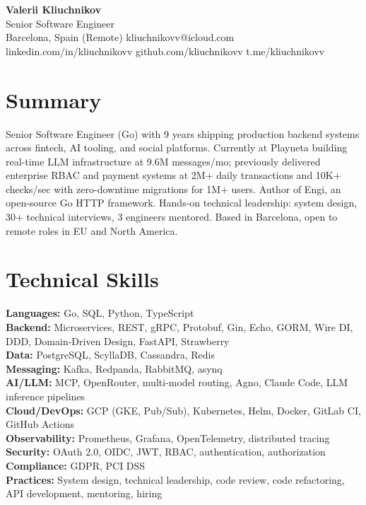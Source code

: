 \documentclass[11pt,a4paper]{article}
\begin{document}
\begin{center}
{\LARGE \textbf{Valerii Kliuchnikov}}\\[3pt]
Senior Software Engineer\\[3pt]
Barcelona, Spain (Remote) \textbar{} kliuchnikovv@icloud.com\\
linkedin.com/in/kliuchnikovv \textbar{} github.com/kliuchnikovv \textbar{} t.me/kliuchnikovv
\end{center}

\section{Summary}
Senior Software Engineer (Go) with 9 years shipping production backend systems across fintech, AI tooling, and social platforms. Currently at Playneta building real-time LLM infrastructure at 9.6M messages/mo; previously delivered enterprise RBAC and payment systems at 2M+ daily transactions and 10K+ checks/sec with zero-downtime migrations for 1M+ users. Author of Engi, an open-source Go HTTP framework. Hands-on technical leadership: system design, 30+ technical interviews, 3 engineers mentored. Based in Barcelona, open to remote roles in EU and North America.

\section{Technical Skills}
\textbf{Languages:} Go, SQL, Python, TypeScript\\
\textbf{Backend:} Microservices, REST, gRPC, Protobuf, Gin, Echo, GORM, Wire DI, DDD, Domain-Driven Design, FastAPI, Strawberry\\
\textbf{Data:} PostgreSQL, ScyllaDB, Cassandra, Redis\\
\textbf{Messaging:} Kafka, Redpanda, RabbitMQ, asynq\\
\textbf{AI/LLM:} MCP, OpenRouter, multi-model routing, Agno, Claude Code, LLM inference pipelines\\
\textbf{Cloud/DevOps:} GCP (GKE, Pub/Sub), Kubernetes, Helm, Docker, GitLab CI, GitHub Actions\\
\textbf{Observability:} Prometheus, Grafana, OpenTelemetry, distributed tracing\\
\textbf{Security:} OAuth 2.0, OIDC, JWT, RBAC, authentication, authorization\\
\textbf{Compliance:} GDPR, PCI DSS\\
\textbf{Practices:} System design, technical leadership, code review, code refactoring, API development, mentoring, hiring
\end{document}
